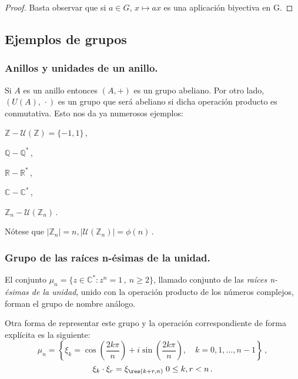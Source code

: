 \begin{proof}
  Basta observar que si $a\in G$, $x \mapsto ax$ es una aplicación biyectiva en G.
\end{proof}

\subsection{Ejemplos de grupos}

\subsubsection{Anillos y unidades de un anillo.}

Si $A$ es un anillo entonces $(A,+)$ es un grupo abeliano. Por otro lado, $(U(A),\,\cdot)$ es un grupo que será abeliano si dicha operación producto es conmutativa. Esto nos da ya numerosos ejemplos:

\begin{itemize*}[label=,itemjoin=\hspace{2em}]
  \item $\mathbb{Z}-\mathcal U\left(\mathbb{Z}\right)=\{-1,1\}$\,,
  \item $\mathbb{Q}-\mathbb{Q}^{*}$\,,
  \item $\mathbb{R}-\mathbb{R}^{*}$\,,
  \item $\mathbb{C}-\mathbb{C}^{*}$\,,
  \item $\mathbb{Z}_n-\mathcal U\left(\mathbb{Z}_n\right)$\,.
\end{itemize*}

Nótese que $|\mathbb{Z}_n| = n,|\mathcal U\left(\mathbb{Z}_n\right)| = \phi(n)$\,.

\subsubsection{Grupo de las raíces n-ésimas de la unidad.}

El conjunto $\mu_n = \{z \in \mathbb{C}^{*} : z^n = 1\,,\ n \geq 2\}$, llamado conjunto de las \textit{raíces n-ésimas de la unidad}, unido con la operación producto de los números complejos, forman el grupo de nombre análogo.

Otra forma de representar este grupo y la operación correspondiente de forma explícita es la siguiente:
$$\mu_n = \left\{\xi_k = \cos\left(\frac{2k\pi}{n}\right)+i\sin\left(\frac{2k\pi}{n}\right),\quad k=0,1,\dots ,n-1\right\}\,,$$
$$\xi_k \cdot \xi_r = \xi_{\res(k+r,n)} \; 0 \le k,r < n\,.$$

